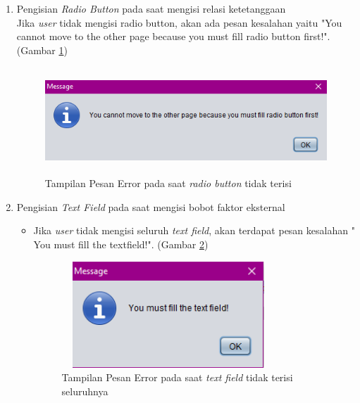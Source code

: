 \begin{enumerate}
\begin{itemize}
	\end{itemize}
	
	\item Pengisian \textit{Radio Button} pada saat mengisi relasi ketetanggaan\\
	Jika \textit{user} tidak mengisi radio button, akan ada pesan kesalahan yaitu "You cannot move to the other page because you must fill radio button first!". (Gambar \ref{pesanError3})
	
		\begin{figure} [H]
	\centering  
	\includegraphics[width=11cm, height=4cm]{pesanError3} 
		\caption[Tampilan Pesan Error pada saat \textit{radio button} tidak terisi]{Tampilan Pesan Error pada saat \textit{radio button} tidak terisi}
	\label{pesanError3} 
\end{figure}

\item Pengisian \textit{Text Field} pada saat mengisi bobot faktor eksternal\\
	\begin{itemize}
		
		\item Jika \textit{user} tidak mengisi seluruh \textit{text field}, akan terdapat pesan kesalahan " You must fill the textfield!". (Gambar \ref{pesanError4})
		
	\begin{figure} [H]
	\centering  
	\includegraphics[width=8cm, height=4cm]{pesanError4} 
		\caption[Tampilan Pesan Error pada saat \textit{text field} tidak terisi seluruhnya]{Tampilan Pesan Error pada saat \textit{text field} tidak terisi seluruhnya}
	\label{pesanError4} 
\end{figure}
		

\end{itemize}
\end{enumerate}
